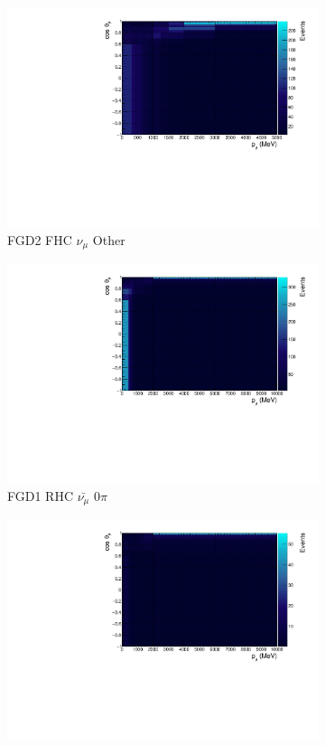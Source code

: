 \begin{figure}
\begin{subfigure}{.32\textwidth}
  \includegraphics[width=0.95\linewidth]{figs/TH2D_MC_FGD2_numuCC_other}
  \caption{FGD2 FHC $\nu_{\mu}$ Other}
  \label{fig:th2dFGD2_numuCC_other}
\end{subfigure}
\centering
\begin{subfigure}{.32\textwidth}
  \centering
  \includegraphics[width=0.95\linewidth]{figs/TH2D_MC_FGD1_anti-numuCC_0pi}
  \caption{FGD1 RHC $\bar{\nu_{\mu}}$ 0$\pi$}
  \label{fig:th2dFGD1_anti-numuCC_0pi}
\end{subfigure}
\begin{subfigure}{.32\textwidth}
  \centering
  \includegraphics[width=0.95\linewidth]{figs/TH2D_MC_FGD1_anti-numuCC_1pi}

\end{subfigure}
\end{figure}
